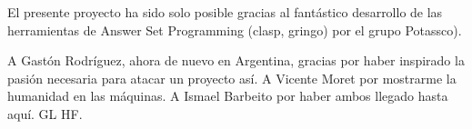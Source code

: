 El presente proyecto ha sido solo posible gracias al fantástico desarrollo de las herramientas de Answer Set Programming (clasp, gringo) por el grupo Potassco). 

A Gastón Rodríguez, ahora de nuevo en Argentina, gracias por haber inspirado la pasión necesaria para atacar un proyecto así. A Vicente Moret por mostrarme la humanidad en las máquinas. A Ismael Barbeito por haber ambos llegado hasta aquí. GL HF.